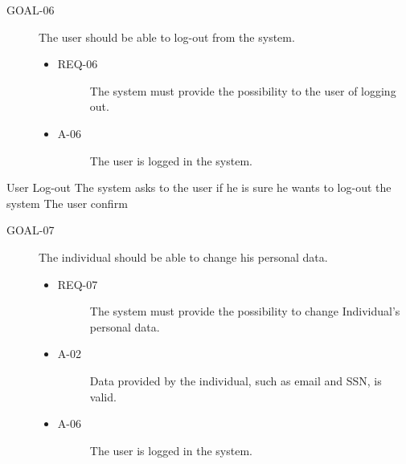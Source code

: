 \documentclass[a4paper]{article}
\newcommand{\requirement}{\ding{229}}%
\begin{document}
        \begin{description}
        	\item[GOAL-06] The user should be able to log-out from the system. 
            	\begin{itemize}
            	    \item[\requirement]
                	\begin{description}
                	\item[REQ-06] The system must provide the possibility to the user of logging out. 
                	\end{description}
                	\item
                	\begin{description}
                	\item[A-06] The user is logged in the system.
                	\end{description}
                	\end{itemize}
        \end{description}
              
       \begin{usecase}{User Log-out}
              {The system asks to the user if he is sure he wants to log-out the system}
              {The user confirm}
        \end{usecase}
       
       \begin{description}
        	\item[GOAL-07] The individual should be able to change his personal data. 
            	\begin{itemize}
            	    \item[\requirement]
                	\begin{description}
                	\item[REQ-07] The system must provide the possibility to change Individual's personal data. 
                	\end{description}
                	\item
                	\begin{description}
                	\item[A-02] Data provided by the individual, such as email and SSN, is valid.
                	\end{description}
                	\item
                	\begin{description}
                	\item[A-06] The user is logged in the system.
                	\end{description}
                	\end{itemize}
        \end{description}
      
\end{document}
